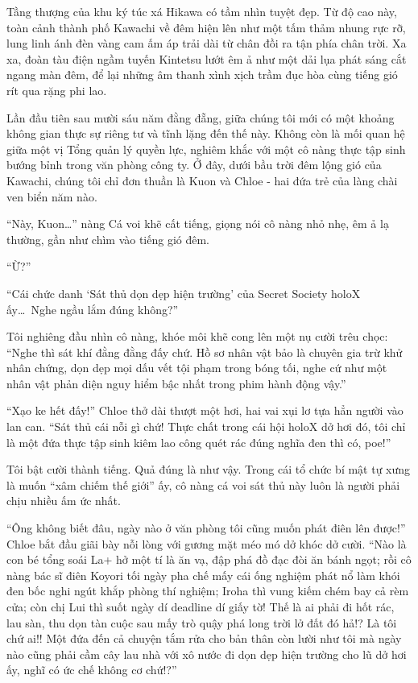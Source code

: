 \documentclass[../main.tex]{subfiles}
\begin{document}
Tầng thượng của khu ký túc xá Hikawa có tầm nhìn tuyệt đẹp. Từ độ cao này, toàn cảnh thành phố Kawachi về đêm hiện lên như một tấm thảm nhung rực rỡ, lung linh ánh đèn vàng cam ấm áp trải dài từ chân đồi ra tận phía chân trời. Xa xa, đoàn tàu điện ngầm tuyến Kintetsu lướt êm ả như một dải lụa phát sáng cắt ngang màn đêm, để lại những âm thanh xình xịch trầm đục hòa cùng tiếng gió rít qua rặng phi lao.

Lần đầu tiên sau mười sáu năm đằng đẵng, giữa chúng tôi mới có một khoảng không gian thực sự riêng tư và tĩnh lặng đến thế này. Không còn là mối quan hệ giữa một vị Tổng quản lý quyền lực, nghiêm khắc với một cô nàng thực tập sinh bướng bỉnh trong văn phòng công ty. Ở đây, dưới bầu trời đêm lộng gió của Kawachi, chúng tôi chỉ đơn thuần là Kuon và Chloe - hai đứa trẻ của làng chài ven biển năm nào.

``Này, Kuon\dots'' nàng Cá voi khẽ cất tiếng, giọng nói cô nàng nhỏ nhẹ, êm ả lạ thường, gần như chìm vào tiếng gió đêm.

``Ừ?''

``Cái chức danh `Sát thủ dọn dẹp hiện trường' của Secret Society holoX ấy\dots\ Nghe ngầu lắm đúng không?''

Tôi nghiêng đầu nhìn cô nàng, khóe môi khẽ cong lên một nụ cười trêu chọc: ``Nghe thì sát khí đằng đằng đấy chứ. Hồ sơ nhân vật bảo là chuyên gia trừ khử nhân chứng, dọn dẹp mọi dấu vết tội phạm trong bóng tối, nghe cứ như một nhân vật phản diện nguy hiểm bậc nhất trong phim hành động vậy.''

``Xạo ke hết đấy!'' Chloe thở dài thượt một hơi, hai vai xụi lơ tựa hẳn người vào lan can. ``Sát thủ cái nỗi gì chứ! Thực chất trong cái hội holoX dở hơi đó, tôi chỉ là một đứa thực tập sinh kiêm lao công quét rác đúng nghĩa đen thì có, poe!''

Tôi bật cười thành tiếng. Quả đúng là như vậy. Trong cái tổ chức bí mật tự xưng là muốn ``xâm chiếm thế giới'' ấy, cô nàng cá voi sát thủ này luôn là người phải chịu nhiều ấm ức nhất.

``Ông không biết đâu, ngày nào ở văn phòng tôi cũng muốn phát điên lên được!'' Chloe bắt đầu giãi bày nỗi lòng với gương mặt méo mó dở khóc dở cười. ``Nào là con bé tổng soái La+ hở một tí là ăn vạ, đập phá đồ đạc đòi ăn bánh ngọt; rồi cô nàng bác sĩ điên Koyori tối ngày pha chế mấy cái ống nghiệm phát nổ làm khói đen bốc nghi ngút khắp phòng thí nghiệm; Iroha thì vung kiếm chém bay cả rèm cửa; còn chị Lui thì suốt ngày dí deadline dí giấy tờ! Thế là ai phải đi hốt rác, lau sàn, thu dọn tàn cuộc sau mấy trò quậy phá long trời lở đất đó hả!? Là tôi chứ ai!! Một đứa đến cả chuyện tắm rửa cho bản thân còn lười như tôi mà ngày nào cũng phải cầm cây lau nhà với xô nước đi dọn dẹp hiện trường cho lũ dở hơi ấy, nghĩ có ức chế không cơ chứ!?''
\end{document}
